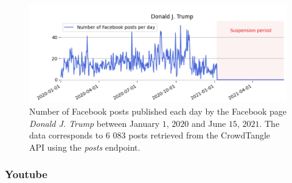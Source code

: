 \documentclass[11pt,a4paper]{article}
\begin{document}

\begin{figure}
\begin{multicols}{1}
    \includegraphics[scale=0.22]{./img/fb/fig1_fb.png}\par 
    \end{multicols}
\caption{Number of Facebook posts published each day by the Facebook page {\it Donald J. Trump} between January $1$, $2020$ and June $15$, $2021$. The data corresponds to $6$ $083$ posts retrieved from the CrowdTangle API using the {\it posts} endpoint.}
\label{fig1_fb}
\end{figure}



\subsubsection{Youtube}
\end{document}
